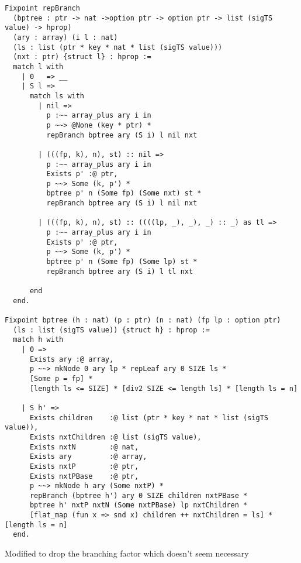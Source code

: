 \documentclass{article}
\begin{document}
\begin{lstlisting}
Fixpoint repBranch
  (bptree : ptr -> nat ->option ptr -> option ptr -> list (sigTS value) -> hprop) 
  (ary : array) (i l : nat)
  (ls : list (ptr * key * nat * list (sigTS value)))
  (nxt : ptr) {struct l} : hprop :=
  match l with
    | 0   => __
    | S l => 
      match ls with
        | nil =>
          p :~~ array_plus ary i in
          p ~~> @None (key * ptr) * 
          repBranch bptree ary (S i) l nil nxt

        | (((fp, k), n), st) :: nil =>
          p :~~ array_plus ary i in
          Exists p' :@ ptr,
          p ~~> Some (k, p') *
          bptree p' n (Some fp) (Some nxt) st *
          repBranch bptree ary (S i) l nil nxt

        | (((fp, k), n), st) :: ((((lp, _), _), _) :: _) as tl =>
          p :~~ array_plus ary i in
          Exists p' :@ ptr,
          p ~~> Some (k, p') *
          bptree p' n (Some fp) (Some lp) st *
          repBranch bptree ary (S i) l tl nxt
          
      end
  end.

Fixpoint bptree (h : nat) (p : ptr) (n : nat) (fp lp : option ptr)
  (ls : list (sigTS value)) {struct h} : hprop :=
  match h with
    | 0 =>
      Exists ary :@ array,
      p ~~> mkNode 0 ary lp * repLeaf ary 0 SIZE ls *
      [Some p = fp] *
      [length ls <= SIZE] * [div2 SIZE <= length ls] * [length ls = n]

    | S h' =>
      Exists children    :@ list (ptr * key * nat * list (sigTS value)),
      Exists nxtChildren :@ list (sigTS value),
      Exists nxtN        :@ nat,
      Exists ary         :@ array,
      Exists nxtP        :@ ptr,
      Exists nxtPBase    :@ ptr,
      p ~~> mkNode h ary (Some nxtP) *
      repBranch (bptree h') ary 0 SIZE children nxtPBase *
      bptree h' nxtP nxtN (Some nxtPBase) lp nxtChildren *
      [flat_map (fun x => snd x) children ++ nxtChildren = ls] * [length ls = n]
  end.
\end{lstlisting}
\newpage
Modified to drop the branching factor which doesn't seem necessary
\end{document}
